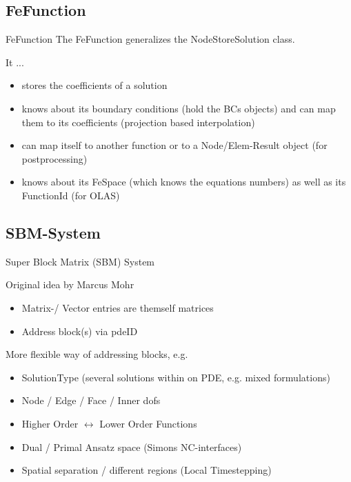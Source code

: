 \documentclass[10pt]{beamer}
\begin{document}
\subsection{FeFunction}
\begin{frame}{FeFunction}
 The FeFunction generalizes the NodeStoreSolution class. 
\begin{block}{It ...}
\begin{itemize}
 \item stores the coefficients of a solution
\item knows about its boundary conditions (hold the BCs objects) and can map them to its coefficients (projection based interpolation)
\item can map itself to another function or to a Node/Elem-Result object (for postprocessing)
\item knows about its FeSpace (which knows the equations numbers) as well as its FunctionId (for OLAS)
\end{itemize}

\end{block}


\end{frame}


\subsection{SBM-System}
\begin{frame}[fragile]{Super Block Matrix (SBM) System}
 \begin{block}{Original idea by Marcus Mohr}
\begin{itemize}
 \item Matrix-/ Vector entries are themself matrices
\item Address block(s) via pdeID
\end{itemize} 
\end{block}

\begin{block}{More flexible way of addressing blocks, e.g.}
\begin{itemize}
  \item SolutionType (several solutions within on PDE, e.g. mixed formulations)
\item Node / Edge / Face / Inner dofs
\item Higher Order $\leftrightarrow$ Lower Order Functions
\item Dual / Primal Ansatz space (Simons NC-interfaces)
\item Spatial separation / different regions (Local Timestepping)
 \end{itemize}
\end{block}
\end{frame}
\end{document}
